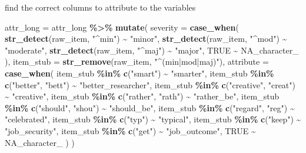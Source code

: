 \documentclass[
]{article}
\newenvironment{Shaded}{\begin{snugshade}}{\end{snugshade}}
\newcommand{\AttributeTok}[1]{\textcolor[rgb]{0.13,0.29,0.53}{#1}}
\newcommand{\ConstantTok}[1]{\textcolor[rgb]{0.56,0.35,0.01}{#1}}
\newcommand{\FunctionTok}[1]{\textcolor[rgb]{0.13,0.29,0.53}{\textbf{#1}}}
\newcommand{\NormalTok}[1]{#1}
\newcommand{\OtherTok}[1]{\textcolor[rgb]{0.56,0.35,0.01}{#1}}
\newcommand{\SpecialCharTok}[1]{\textcolor[rgb]{0.81,0.36,0.00}{\textbf{#1}}}
\newcommand{\StringTok}[1]{\textcolor[rgb]{0.31,0.60,0.02}{#1}}
\begin{document}
find the correct columns to attribute to the variables

\begin{Shaded}
\begin{Highlighting}[]
\NormalTok{attr\_long }\OtherTok{=}\NormalTok{ attr\_long }\SpecialCharTok{\%\textgreater{}\%}
  \FunctionTok{mutate}\NormalTok{(}
    \AttributeTok{severity =} \FunctionTok{case\_when}\NormalTok{(}
      \FunctionTok{str\_detect}\NormalTok{(raw\_item, }\StringTok{"\^{}min"}\NormalTok{) }\SpecialCharTok{\textasciitilde{}} \StringTok{"minor"}\NormalTok{,}
      \FunctionTok{str\_detect}\NormalTok{(raw\_item, }\StringTok{"\^{}mod"}\NormalTok{) }\SpecialCharTok{\textasciitilde{}} \StringTok{"moderate"}\NormalTok{,}
      \FunctionTok{str\_detect}\NormalTok{(raw\_item, }\StringTok{"\^{}maj"}\NormalTok{) }\SpecialCharTok{\textasciitilde{}} \StringTok{"major"}\NormalTok{,}
      \ConstantTok{TRUE} \SpecialCharTok{\textasciitilde{}} \ConstantTok{NA\_character\_}
\NormalTok{    ),}
    \AttributeTok{item\_stub =} \FunctionTok{str\_remove}\NormalTok{(raw\_item, }\StringTok{"\^{}(min|mod|maj)"}\NormalTok{),}
    \AttributeTok{attribute =} \FunctionTok{case\_when}\NormalTok{(}
\NormalTok{      item\_stub }\SpecialCharTok{\%in\%} \FunctionTok{c}\NormalTok{(}\StringTok{"smart"}\NormalTok{) }\SpecialCharTok{\textasciitilde{}} \StringTok{"smarter"}\NormalTok{,}
\NormalTok{      item\_stub }\SpecialCharTok{\%in\%} \FunctionTok{c}\NormalTok{(}\StringTok{"better"}\NormalTok{, }\StringTok{"bett"}\NormalTok{) }\SpecialCharTok{\textasciitilde{}} \StringTok{"better\_researcher"}\NormalTok{,}
\NormalTok{      item\_stub }\SpecialCharTok{\%in\%} \FunctionTok{c}\NormalTok{(}\StringTok{"creative"}\NormalTok{, }\StringTok{"creat"}\NormalTok{) }\SpecialCharTok{\textasciitilde{}} \StringTok{"creative"}\NormalTok{,}
\NormalTok{      item\_stub }\SpecialCharTok{\%in\%} \FunctionTok{c}\NormalTok{(}\StringTok{"rather"}\NormalTok{, }\StringTok{"rath"}\NormalTok{) }\SpecialCharTok{\textasciitilde{}} \StringTok{"rather\_be"}\NormalTok{,}
\NormalTok{      item\_stub }\SpecialCharTok{\%in\%} \FunctionTok{c}\NormalTok{(}\StringTok{"should"}\NormalTok{, }\StringTok{"shou"}\NormalTok{) }\SpecialCharTok{\textasciitilde{}} \StringTok{"should\_be"}\NormalTok{,}
\NormalTok{      item\_stub }\SpecialCharTok{\%in\%} \FunctionTok{c}\NormalTok{(}\StringTok{"regard"}\NormalTok{, }\StringTok{"reg"}\NormalTok{) }\SpecialCharTok{\textasciitilde{}} \StringTok{"celebrated"}\NormalTok{,}
\NormalTok{      item\_stub }\SpecialCharTok{\%in\%} \FunctionTok{c}\NormalTok{(}\StringTok{"typ"}\NormalTok{) }\SpecialCharTok{\textasciitilde{}} \StringTok{"typical"}\NormalTok{,}
\NormalTok{      item\_stub }\SpecialCharTok{\%in\%} \FunctionTok{c}\NormalTok{(}\StringTok{"keep"}\NormalTok{) }\SpecialCharTok{\textasciitilde{}} \StringTok{"job\_security"}\NormalTok{,}
\NormalTok{      item\_stub }\SpecialCharTok{\%in\%} \FunctionTok{c}\NormalTok{(}\StringTok{"get"}\NormalTok{) }\SpecialCharTok{\textasciitilde{}} \StringTok{"job\_outcome"}\NormalTok{,}
      \ConstantTok{TRUE} \SpecialCharTok{\textasciitilde{}} \ConstantTok{NA\_character\_}
\NormalTok{    )}
\NormalTok{  )}
\end{Highlighting}
\end{Shaded}
\end{document}
